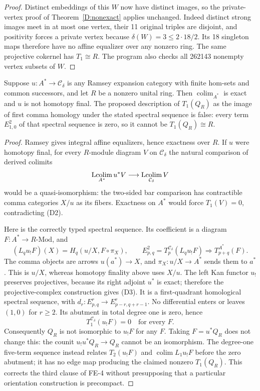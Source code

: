 \begin{proof}
Distinct embeddings of this $W$ now have distinct images, so the
private-vertex proof of Theorem~\ref{D:nonexact} applies unchanged.
Indeed distinct strong images meet in at most one vertex, their
11 original triples are disjoint, and positivity forces a private
vertex because $\delta(W)=3\leq2\cdot18/2$. Its 18 singleton
maps therefore have no affine equalizer over any nonzero ring.
The same projective cokernel has $T_1\cong R$.
The program also checks all 262143 nonempty vertex subsets of $W$.
\end{proof}

\begin{proposition}
\label{D:expansion}
Suppose $u:A^*\to\mathcal C_\delta$ is any Ramsey expansion
category with finite hom-sets and common successors, and let $R$
be a nonzero unital ring. Then $\operatorname{colim}_{A^*}$ is
exact and $u$ is not homotopy final. The proposed description of
$T_1(Q_R)$ as the image of first comma homology under the stated
spectral sequence is false: every term $E^2_{1,0}$ of that
spectral sequence is zero, so it cannot be $T_1(Q_R)\cong R$.
\end{proposition}
\begin{proof}
Ramsey gives integral affine equalizers, hence exactness over $R$.
If $u$ were homotopy final, for every $R$-module diagram $V$ on
$\mathcal C_\delta$ the natural comparison of derived colimits
\[
 \mathop{\rm Lcolim}_{A^*}u^*V\longrightarrow
 \mathop{\rm Lcolim}_{\mathcal C_\delta}V
\]
would be a quasi-isomorphism: the two-sided bar comparison has
contractible comma categories $X/u$ as its fibers. Exactness on
$A^*$ would force $T_1(V)=0$, contradicting (D2).

Here is the correctly typed spectral sequence. Its coefficient
is a diagram $F:A^*\to R\text{-}\mathrm{Mod}$, and
\[
 (L_q u_!F)(X)=H_q(u/X,F\circ\pi_X),
 \qquad
 E^2_{p,q}=T_p^{\mathcal C_\delta}(L_q u_!F)
 \Longrightarrow T_{p+q}^{A^*}(F).
 \tag{D3}\label{eq:D-Kan-ss}
\]
The comma objects are arrows $u(a^*)\to X$, and
$\pi_X:u/X\to A^*$ sends them to $a^*$. This is $u/X$, whereas
homotopy finality above uses $X/u$. The left Kan functor $u_!$
preserves projectives, because its right adjoint $u^*$ is exact;
therefore the projective-complex construction gives (D3).
It is a first-quadrant homological spectral sequence, with
$d_r:E^r_{p,q}\to E^r_{p-r,q+r-1}$. No differential enters or
leaves $(1,0)$ for $r\geq2$. Its abutment in total degree one is
zero, hence
\[
                       T_1^{\mathcal C_\delta}(u_!F)=0
                       \quad\text{for every }F.
\]
Consequently $Q_R$ is not isomorphic to $u_!F$ for any $F$.
Taking $F=u^*Q_R$ does not change this: the counit
$u_!u^*Q_R\to Q_R$ cannot be an isomorphism.
The degree-one five-term sequence instead relates
$T_2(u_!F)$ and $\operatorname{colim} L_1u_!F$ before the zero
abutment; it has no edge map producing the claimed nonzero
$T_1(Q_R)$. This corrects the third clause of FE-4 without
presupposing that a particular orientation construction is
precompact.
\end{proof}
